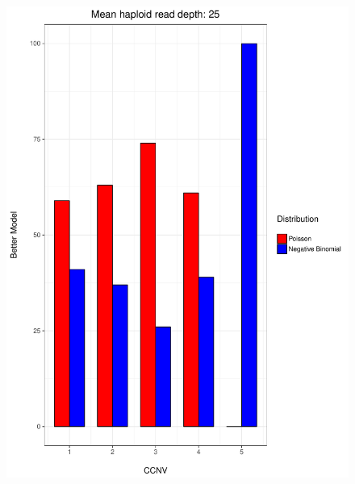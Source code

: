 \documentclass[11pt]{article}
\begin{document}
\begin{figure}
\begin{center}
\includegraphics[scale=0.28]{../Results/Second_Analysis/Better_model_bar25.pdf}

\end{center}
\end{figure}
\end{document}
